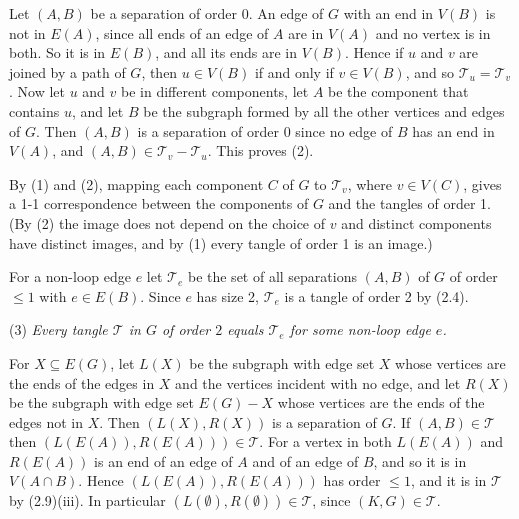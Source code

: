 {Let $(A, B)$ be a separation of order 0. An edge of $G$ with an end in $V(B)$ is not in $E(A)$, since all ends of an edge of $A$ are in $V(A)$ and no vertex is in both. So it is in $E(B)$, and all its ends are in $V(B)$. Hence if $u$ and $v$ are joined by a path of $G$, then $u \in V(B)$ if and only if $v \in V(B)$, and so $\mathscr{T}_u = \mathscr{T}_v$. Now let $u$ and $v$ be in different components, let $A$ be the component that contains $u$, and let $B$ be the subgraph formed by all the other vertices and edges of $G$. Then $(A, B)$ is a separation of order 0 since no edge of $B$ has an end in $V(A)$, and $(A, B) \in \mathscr{T}_v - \mathscr{T}_u$. This proves (2).

By (1) and (2), mapping each component $C$ of $G$ to $\mathscr{T}_v$, where $v \in V(C)$, gives a 1-1 correspondence between the components of $G$ and the tangles of order 1. (By (2) the image does not depend on the choice of $v$ and distinct components have distinct images, and by (1) every tangle of order 1 is an image.)

For a non-loop edge $e$ let $\mathscr{T}_e$ be the set of all separations $(A, B)$ of $G$ of order $\le 1$ with $e \in E(B)$. Since $e$ has size 2, $\mathscr{T}_e$ is a tangle of order 2 by (2.4).

\hspace*{12pt}(3) \textit{Every tangle $\mathscr{T}$ in $G$ of order $2$ equals $\mathscr{T}_e$ for some non-loop edge $e$.}

For $X \subseteq E(G)$, let $L(X)$ be the subgraph with edge set $X$ whose vertices are the ends of the edges in $X$ and the vertices incident with no edge, and let $R(X)$ be the subgraph with edge set $E(G) - X$ whose vertices are the ends of the edges not in $X$. Then $(L(X), R(X))$ is a separation of $G$. If $(A, B) \in \mathscr{T}$ then $(L(E(A)), R(E(A))) \in \mathscr{T}$. For a vertex in both $L(E(A))$ and $R(E(A))$ is an end of an edge of $A$ and of an edge of $B$, and so it is in $V(A \cap B)$. Hence $(L(E(A)), R(E(A)))$ has order $\le 1$, and it is in $\mathscr{T}$ by (2.9)(iii). In particular $(L(\emptyset), R(\emptyset)) \in \mathscr{T}$, since $(K, G) \in \mathscr{T}$.

}

